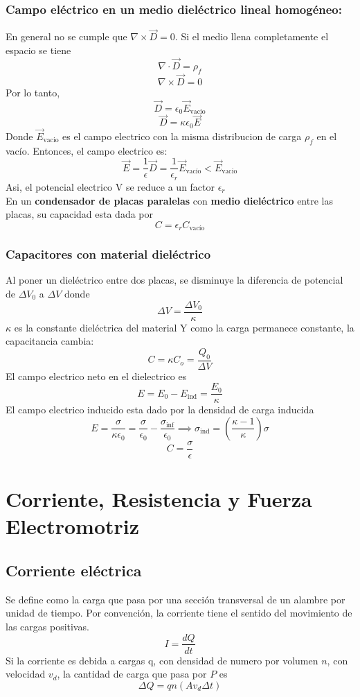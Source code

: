 \documentclass[a4paper, 10pt]{article}
\begin{document}
\begin{multicols*}{2}
	\subsubsection{Campo eléctrico en un medio dieléctrico lineal homogéneo: }En general no se cumple que $\nabla \times \vec{D}=0$. Si el medio llena completamente el espacio se tiene $$\nabla \cdot \vec{D}=\rho _f$$
	$$\nabla \times \vec{D}=0$$
	Por lo tanto, 
	$$\vec{D}= \epsilon_0 \vec{E}_{\text{vacio}}$$
	$$\vec{D}=\kappa \epsilon_0 \vec{E}$$
	Donde $\vec{E}_{\text{vacio}}$ es el campo electrico con la misma distribucion de carga $\rho_f$ en el vacío.
	Entonces, el campo electrico es:
	$$\vec{E}= \frac{1}{\epsilon}\vec{D}= \frac{1}{\epsilon_r}\vec{E}_{\text{vacío}} < \vec{E}_{\text{vacio}}$$
	Asi, el potencial electrico V se reduce a un factor $\epsilon_r$\\
	En un \textbf{condensador de placas paralelas } 
  con \textbf{medio dieléctrico} entre las placas, su capacidad esta dada por 
  $$C = \epsilon _r C_{\text{vacío}}$$
	    
	\subsubsection{Capacitores con material dieléctrico}
	Al poner un dieléctrico entre dos placas, se disminuye la diferencia de potencial de $\Delta V_0$ a $\Delta V$ donde
	$$\Delta V = \frac{\Delta V_0}{\kappa}$$
	$\kappa$ es la constante dieléctrica del material
	Y como la carga permanece constante, la capacitancia cambia:
	$$C = \kappa C_o = \frac{Q_0}{\Delta V}$$
	El campo electrico neto en el dielectrico es
	$$E= E_0 -  E_{\text{ind}} = \frac{E_0}{\kappa}$$
	El campo electrico inducido esta dado por la densidad de carga inducida
	$$E=\frac{\sigma}{\kappa \epsilon_0}= \frac{\sigma}{\epsilon_0}- \frac{\sigma_{\text{inf}}}{\epsilon_0} \implies \sigma_{\text{ind}} = (\frac{\kappa -1}{\kappa})\sigma$$
	$$C = \frac{\sigma}{\epsilon}$$
	    
	\section{Corriente, Resistencia y Fuerza Electromotriz}
	\subsection{Corriente eléctrica}
	Se define como la carga que pasa por una sección transversal de un alambre por unidad de tiempo. Por convención, la corriente tiene el sentido del movimiento de las cargas positivas.
	$$I = \frac{dQ}{dt}$$
	Si la corriente es debida a cargas q, con densidad de numero por volumen $n$, con velocidad $v_d$, la cantidad de carga que pasa por $P$ es
	$$\Delta Q= qn(Av_d\Delta t)$$
	

\end{multicols*}
\end{document}
